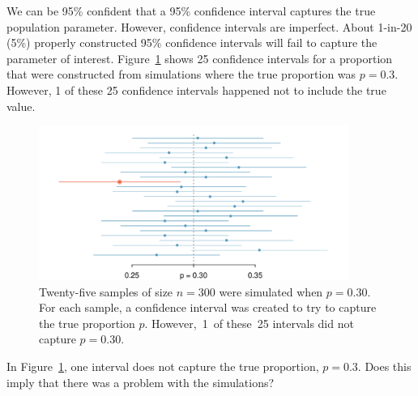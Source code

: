 \D{\newpage}

We can be 95\% confident that a 95\% confidence interval captures the true population parameter. However, confidence intervals are imperfect. About 1-in-20 (5\%) properly constructed 95\% confidence intervals will fail to capture the parameter of interest. Figure~\ref{95PercentConfidenceInterval} shows 25 confidence intervals for a proportion that were constructed from simulations where the true proportion was $p = 0.3$. However, 1 of these 25 confidence intervals happened not to include the true value.

\begin{figure}[h]
\centering
\includegraphics[width=0.9\textwidth]{ch_foundations_for_inf/figures/95PercentConfidenceInterval/95PercentConfidenceInterval}
\caption{Twenty-five samples of size $n=300$ were simulated when $p = 0.30$. For each sample, a confidence interval was created to try to capture the true proportion $p$. However,~1~of these~25 intervals did not capture $p = 0.30$.}
\label{95PercentConfidenceInterval}
\end{figure}

\begin{exercisewrap}
\begin{nexercise}
In Figure~\ref{95PercentConfidenceInterval}, one interval does not capture the true proportion, $p = 0.3$. Does this imply that there was a problem with the simulations?\footnotemark
\end{nexercise}
\end{exercisewrap}


\D{\newpage}

